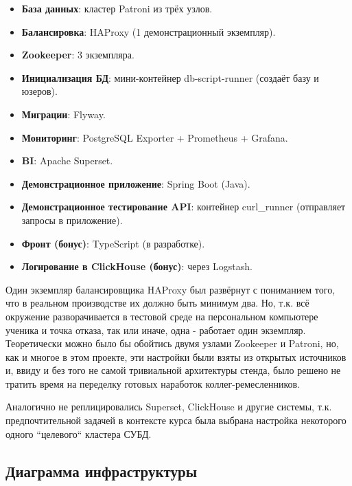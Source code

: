\documentclass[a4paper,12pt]{article}
\begin{document}
    \begin{itemize}
        \item \textbf{База данных}: кластер Patroni из трёх узлов.
        \item \textbf{Балансировка}: HAProxy (1 демонстрационный экземпляр).
        \item \textbf{Zookeeper}: 3 экземпляра.
        \item \textbf{Инициализация БД}: мини-контейнер db-script-runner (создаёт базу и юзеров).
        \item \textbf{Миграции}: Flyway.
        \item \textbf{Мониторинг}: PostgreSQL Exporter + Prometheus + Grafana.
        \item \textbf{BI}: Apache Superset.
        \item \textbf{Демонстрационное приложение}: Spring Boot (Java).
        \item \textbf{Демонстрационное тестирование API}: контейнер curl\_runner (отправляет запросы в приложение).
        \item \textbf{Фронт (бонус)}: TypeScript (в разработке).
        \item \textbf{Логирование в ClickHouse (бонус)}: через Logstash.
    \end{itemize}

    Один экземпляр балансировщика HAProxy был развёрнут с пониманием того, что в реальном производстве их должно быть
    минимум два.
    Но, т.к. всё окружение разворачивается в тестовой среде на персональном компьютере ученика и точка отказа, так или
    иначе, одна - работает один экземпляр.
    Теоретически можно было бы обойтись двумя узлами Zookeeper и Patroni, но, как и многое в этом проекте, эти настройки
    были взяты из открытых источников и, ввиду и без того не самой тривиальной архитектуры стенда, было решено
    не тратить время на переделку готовых наработок коллег-ремесленников.

    Аналогично не реплицировались Superset, ClickHouse и другие системы, т.к. предпочтительной задачей в контексте курса
    была выбрана настройка некоторого одного ``целевого`` кластера СУБД.

    \newpage

    \subsection{Диаграмма инфраструктуры}
\end{document}
